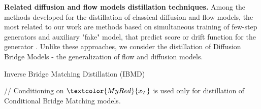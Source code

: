 \textbf{Related diffusion and flow models distillation techniques.} 
Among the methods developed for the distillation of classical diffusion and flow models, the most related to our work are methods based on simultaneous training of few-step generators and auxiliary "fake" model, that predict score or drift function for the generator \citep{yin2024one, yin2024improved, zhou2024score, huang2024flow}. Unlike these approaches, we consider the distillation of Diffusion Bridge Models - the generalization of flow and diffusion models.
\vspace{0mm}
\begin{algorithm}[h]
    \caption{Inverse Bridge Matching Distillation (IBMD)}\label{alg:ibmd}
    // Conditioning on $\textcolor{MyRed}{x_T}$ is used only for distillation of Conditional Bridge Matching models. \\
\end{algorithm}
